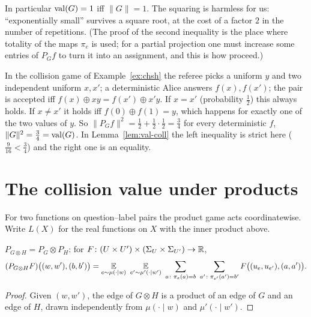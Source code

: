 \noindent
In particular $\operatorname{val}(G)=1$ iff $\|G\|=1$.  The squaring is harmless for us: ``exponentially small'' survives a square root, at the cost of a factor $2$ in the number of repetitions.
(The proof of the second inequality is the place where totality of the maps $\pi_e$ is used; for a partial projection one must increase some entries of $P_Gf$ to turn it into an assignment, and this is how \citet{DinurSteurer14} proceed.)

\begin{example}\label{ex:chsh-coll}
In the collision game of Example~\ref{ex:chsh} the referee picks a uniform $y$ and two independent uniform $x,x'$; a deterministic Alice answers $f(x),f(x')$; the pair is accepted iff $f(x)\oplus xy=f(x')\oplus x'y$.
If $x=x'$ (probability $\frac12$) this always holds.  If $x\ne x'$ it holds iff $f(0)\oplus f(1)=y$, which happens for exactly one of the two values of $y$.  So $\|P_Gf\|^2=\frac12+\frac12\cdot\frac12=\frac34$ for every deterministic $f$, \ie
$\|G\|^2=\frac34=\operatorname{val}(G)$.  In Lemma~\ref{lem:val-coll} the left inequality is strict here ($\frac9{16}<\frac34$) and the right one is an equality.
\end{example}


\section{The collision value under products}
\label{sec:tensor}

For two functions on question--label pairs the product game acts coordinatewise.  Write $L(X)$ for the real functions on $X$ with the inner product above.

\begin{lemma}\label{lem:tensor}
$P_{G\otimes H}=P_G\otimes P_H$: for $F\colon(U\times U')\times(\Sigma_U\times\Sigma_{U'})\to\mathbb{R}$,
\[
  (P_{G\otimes H}F)\big((w,w'),(b,b')\big)=\E_{e\sim\mu(\cdot\mid w)}\ \E_{e'\sim\mu'(\cdot\mid w')}\ \sum_{a\colon\pi_e(a)=b}\ \sum_{a'\colon\pi_{e'}(a')=b'}F\big((u_e,u_{e'}),(a,a')\big).
\]
\end{lemma}
\begin{proof}
Given $(w,w')$, the edge of $G\otimes H$ is a product of an edge of $G$ and an edge of $H$, drawn independently from $\mu(\cdot\mid w)$ and $\mu'(\cdot\mid w')$.
\end{proof}

